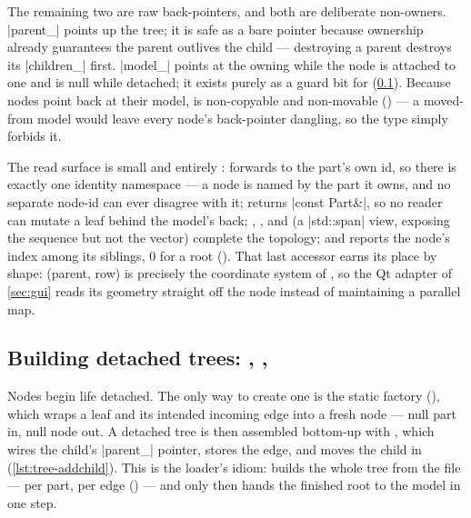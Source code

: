 The remaining two are raw back-pointers, and both are deliberate non-owners.
\cppinline|parent_| points up the tree; it is safe as a bare pointer because ownership already
guarantees the parent outlives the child --- destroying a parent destroys its
\cppinline|children_| first. \cppinline|model_| points at the owning  while the
node is attached to one and is null while detached; it exists purely as a guard bit for
 (\cref{sec:tree-detached}). Because nodes point back at their model,
 is non-copyable and non-movable () --- a
moved-from model would leave every node's back-pointer dangling, so the type simply forbids it.

The read surface is small and entirely :  forwards to the part's own id, so
there is exactly one identity namespace --- a node is named by the part it owns, and no separate
node-id can ever disagree with it;  returns \cppinline|const Part&|, so no reader can
mutate a leaf behind the model's back; , , and  (a
\cppinline|std::span| view, exposing the sequence but not the vector) complete the topology; and
 reports the node's index among its siblings, 0 for a root
(). That last accessor earns its place by shape: (parent, row)
is precisely the coordinate system of , so the Qt adapter of
\cref{sec:gui} reads its geometry straight off the node instead of maintaining a parallel map.

\subsection[Building detached trees: make, addChild, clone]{Building detached trees: , , }
\label{sec:tree-detached}

Nodes begin life detached. The only way to create one is the static factory
 (), which wraps a leaf and its
intended incoming edge into a fresh node --- null part in, null node out. A detached tree is then
assembled bottom-up with , which wires the child's \cppinline|parent_| pointer,
stores the edge, and moves the child in (\cref{lst:tree-addchild}). This is the loader's idiom:
 builds the whole tree from the file ---  per part,
 per edge () --- and only then hands the
finished root to the model in one step.

